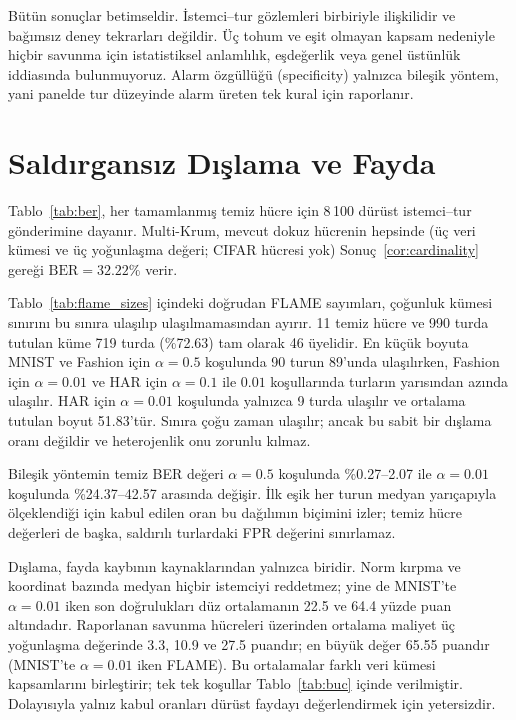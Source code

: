 \documentclass[journal]{IEEEtran}
\newcommand{\BER}{\mathrm{BER}}
\begin{document}
Bütün sonuçlar betimseldir. İstemci--tur gözlemleri birbiriyle ilişkilidir ve bağımsız deney tekrarları değildir. Üç tohum ve eşit olmayan kapsam nedeniyle hiçbir savunma için istatistiksel anlamlılık, eşdeğerlik veya genel üstünlük iddiasında bulunmuyoruz. Alarm özgüllüğü (specificity) yalnızca bileşik yöntem, yani panelde tur düzeyinde alarm üreten tek kural için raporlanır.

\section{Saldırgansız Dışlama ve Fayda}\label{sec:benign}




Tablo~\ref{tab:ber}, her tamamlanmış temiz hücre için 8\,100 dürüst istemci--tur gönderimine dayanır. Multi-Krum, mevcut dokuz hücrenin hepsinde (üç veri kümesi ve üç yoğunlaşma değeri; CIFAR hücresi yok) Sonuç~\ref{cor:cardinality} gereği $\BER=32.22\%$ verir.

Tablo~\ref{tab:flame_sizes} içindeki doğrudan FLAME sayımları, çoğunluk kümesi sınırını bu sınıra ulaşılıp ulaşılmamasından ayırır. 11 temiz hücre ve 990 turda tutulan küme 719 turda (\%72.63) tam olarak 46 üyelidir. En küçük boyuta MNIST ve Fashion için $\alpha=0.5$ koşulunda 90 turun 89'unda ulaşılırken, Fashion için $\alpha=0.01$ ve HAR için $\alpha=0.1$ ile $0.01$ koşullarında turların yarısından azında ulaşılır. HAR için $\alpha=0.01$ koşulunda yalnızca 9 turda ulaşılır ve ortalama tutulan boyut 51.83'tür. Sınıra çoğu zaman ulaşılır; ancak bu sabit bir dışlama oranı değildir ve heterojenlik onu zorunlu kılmaz.

Bileşik yöntemin temiz BER değeri $\alpha=0.5$ koşulunda \%0.27--2.07 ile $\alpha=0.01$ koşulunda \%24.37--42.57 arasında değişir. İlk eşik her turun medyan yarıçapıyla ölçeklendiği için kabul edilen oran bu dağılımın biçimini izler; temiz hücre değerleri de başka, saldırılı turlardaki FPR değerini sınırlamaz.

Dışlama, fayda kaybının kaynaklarından yalnızca biridir. Norm kırpma ve koordinat bazında medyan hiçbir istemciyi reddetmez; yine de MNIST'te $\alpha=0.01$ iken son doğrulukları düz ortalamanın 22.5 ve 64.4 yüzde puan altındadır. Raporlanan savunma hücreleri üzerinden ortalama maliyet üç yoğunlaşma değerinde 3.3, 10.9 ve 27.5 puandır; en büyük değer 65.55 puandır (MNIST'te $\alpha=0.01$ iken FLAME). Bu ortalamalar farklı veri kümesi kapsamlarını birleştirir; tek tek koşullar Tablo~\ref{tab:buc} içinde verilmiştir. Dolayısıyla yalnız kabul oranları dürüst faydayı değerlendirmek için yetersizdir.
\end{document}
